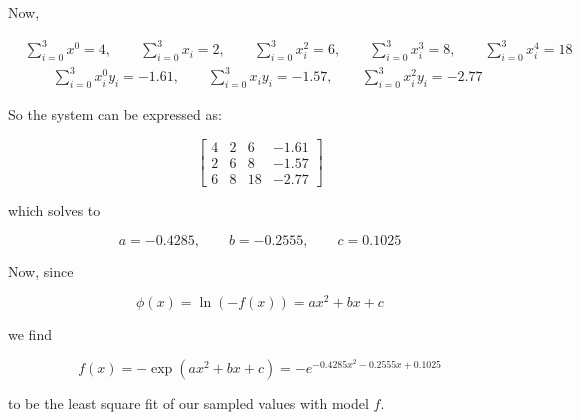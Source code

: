 \documentclass[12pt]{article}
\theoremstyle{definition}
\begin{document}
Now,

\begin{align*}
    &\sum_{i=0}^3 x^0 = 4, \qquad \sum_{i=0}^3 x_i = 2, \qquad \sum_{i=0}^3 x_i^2
    = 6, \qquad \sum_{i=0}^3 x_i^3 = 8, \qquad \sum_{i=0}^3 x_i^4 = 18 \\ 
    &\qquad\sum_{i=0}^3 x_i^0 y_i = -1.61, \qquad \sum_{i=0}^3 x_i y_i = -1.57, \qquad
    \sum_{i=0}^3 x_i^2 y_i = -2.77
\end{align*}

So the system can be expressed as:

\begin{equation*}
    \begin{bmatrix} 
        4 & 2 & 6 & -1.61 \\ 
        2 & 6 & 8 & -1.57 \\ 
        6 & 8 & 18 & -2.77
    \end{bmatrix} 
\end{equation*}

which solves to 

\begin{equation*}
    a = -0.4285, \qquad b = -0.2555, \qquad c = 0.1025
\end{equation*}

Now, since 

\begin{equation*}
    \phi(x) = \ln(-f(x)) = ax^2 +bx + c
\end{equation*}

we find 

\begin{equation*}
    f(x) = -\exp\left( ax^2 + bx + c \right) = -e^{-0.4285 x^2 - 0.2555 x +
    0.1025}
\end{equation*}

to be the least square fit of our sampled values with model $f$.

\end{document}
